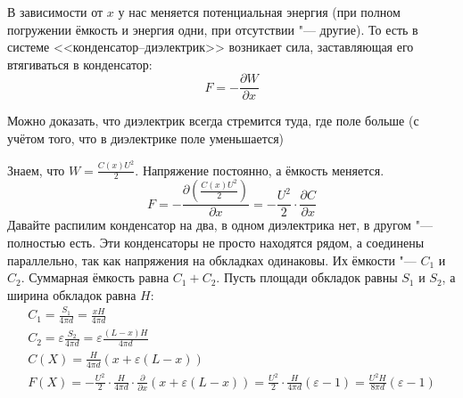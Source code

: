 		В зависимости от $x$ у нас меняется потенциальная энергия (при полном погружении ёмкость и энергия одни,
		при отсутствии "--- другие).
		То есть в системе <<конденсатор--диэлектрик>> возникает сила, заставляющая его втягиваться в конденсатор:
		\[ F = - \frac{\partial W}{\partial x} \]
		\begin{Rem}
			Можно доказать, что диэлектрик всегда стремится туда, где поле больше
			(с учётом того, что в диэлектрике поле уменьшается)
		\end{Rem}

		Знаем, что $W = \frac{C(x)U^2}{2}$.
		Напряжение постоянно, а ёмкость меняется.
		\[F = -\frac{\partial\left(\frac{C(x)U^2}{2}\right)}{\partial x} = -\frac{U^2}{2} \cdot \frac{\partial C}{\partial x}\]
		Давайте распилим конденсатор на два, в одном диэлектрика нет, в другом "--- полностью есть.
		Эти конденсаторы не просто находятся рядом, а соединены параллельно, так как напряжения на обкладках одинаковы.
		Их ёмкости "--- $C_1$ и $C_2$.
		Суммарная ёмкость равна $C_1+C_2$.
		Пусть площади обкладок равны $S_1$ и $S_2$, а ширина обкладок равна $H$:
		\begin{gather*}
		C_1=\frac{S_1}{4\pi d} = \frac{xH}{4\pi d} \\
		C_2=\varepsilon\frac{S_2}{4\pi d} = \varepsilon\frac{(L-x)H}{4\pi d} \\
		C(X) = \frac{H}{4\pi d}(x+\varepsilon(L-x)) \\
		F(X) = -\frac{U^2}{2} \cdot \frac{H}{4\pi d} \cdot \frac{\partial}{\partial x}(x + \varepsilon(L-x))
		     = \frac{U^2}{2} \cdot \frac{H}{4\pi d}(\varepsilon-1)
		     = \frac{U^2H}{8\pi d} (\varepsilon-1)
		\end{gather*}
